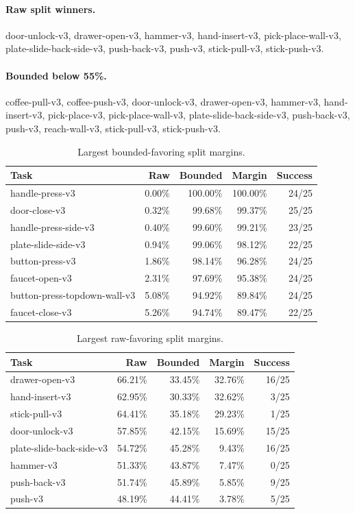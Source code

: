 \paragraph{Raw split winners.} door-unlock-v3, drawer-open-v3, hammer-v3, hand-insert-v3, pick-place-wall-v3, plate-slide-back-side-v3, push-back-v3, push-v3, stick-pull-v3, stick-push-v3.


\paragraph{Bounded below 55\%.} coffee-pull-v3, coffee-push-v3, door-unlock-v3, drawer-open-v3, hammer-v3, hand-insert-v3, pick-place-v3, pick-place-wall-v3, plate-slide-back-side-v3, push-back-v3, push-v3, reach-wall-v3, stick-pull-v3, stick-push-v3.


\begin{table}[H]
\centering
\caption{Largest bounded-favoring split margins.}
\label{tab:action-audit-bounded-margins}
\begin{tabular}{@{}lrrrr@{}}
\toprule
Task & Raw & Bounded & Margin & Success \\
\midrule
handle-press-v3 & 0.00\% & 100.00\% & 100.00\% & 24/25 \\
door-close-v3 & 0.32\% & 99.68\% & 99.37\% & 25/25 \\
handle-press-side-v3 & 0.40\% & 99.60\% & 99.21\% & 23/25 \\
plate-slide-side-v3 & 0.94\% & 99.06\% & 98.12\% & 22/25 \\
button-press-v3 & 1.86\% & 98.14\% & 96.28\% & 24/25 \\
faucet-open-v3 & 2.31\% & 97.69\% & 95.38\% & 24/25 \\
button-press-topdown-wall-v3 & 5.08\% & 94.92\% & 89.84\% & 24/25 \\
faucet-close-v3 & 5.26\% & 94.74\% & 89.47\% & 22/25 \\
\bottomrule
\end{tabular}
\end{table}


\begin{table}[H]
\centering
\caption{Largest raw-favoring split margins.}
\label{tab:action-audit-raw-margins}
\begin{tabular}{@{}lrrrr@{}}
\toprule
Task & Raw & Bounded & Margin & Success \\
\midrule
drawer-open-v3 & 66.21\% & 33.45\% & 32.76\% & 16/25 \\
hand-insert-v3 & 62.95\% & 30.33\% & 32.62\% & 3/25 \\
stick-pull-v3 & 64.41\% & 35.18\% & 29.23\% & 1/25 \\
door-unlock-v3 & 57.85\% & 42.15\% & 15.69\% & 15/25 \\
plate-slide-back-side-v3 & 54.72\% & 45.28\% & 9.43\% & 16/25 \\
hammer-v3 & 51.33\% & 43.87\% & 7.47\% & 0/25 \\
push-back-v3 & 51.74\% & 45.89\% & 5.85\% & 9/25 \\
push-v3 & 48.19\% & 44.41\% & 3.78\% & 5/25 \\
\bottomrule
\end{tabular}
\end{table}


